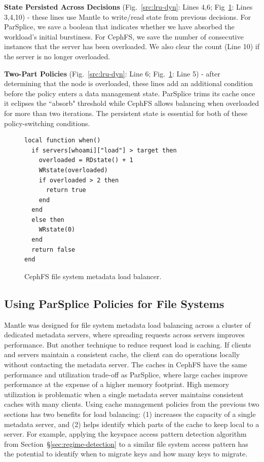 \textbf{State Persisted Across Decisions} (Fig.~\ref{src:lru-dyn}: Lines 4,6;
Fig~\ref{src:lua-cephfs}: Lines 3,4,10) - these lines use Mantle to write/read state
from previous decisions.  For ParSplice, we save a boolean that indicates
whether we have absorbed the workload's initial burstiness. For CephFS, we save
the number of consecutive instances that the server has been overloaded. We
also clear the count (Line 10) if the server is no longer overloaded. 

\textbf{Two-Part Policies} (Fig.~\ref{src:lru-dyn}: Line 6;
Fig.~\ref{src:lua-cephfs}: Line 5) - after determining that the node is
overloaded, these lines add an additional condition before the policy enters a
data management state.  ParSplice trims its cache once it eclipses the
``absorb" threshold while CephFS allows balancing when overloaded for more than
two iterations. The persistent state is essential for both of these
policy-switching conditions.

\begin{figure}[t]
\footnotesize
\begin{verbatim}
local function when()
  if servers[whoami]["load"] > target then
    overloaded = RDstate() + 1
    WRstate(overloaded)
    if overloaded > 2 then
      return true
    end
  end
  else then
    WRstate(0)
  end
  return false
end
\end{verbatim}
\caption{CephFS file system metadata load balancer.\label{src:lua-cephfs}}
\end{figure}

\subsection{Using ParSplice Policies for File Systems}


Mantle was designed for file system metadata load balancing across a cluster of
dedicated metadata servers, where spreading requests across servers improves
performance. But another technique to reduce request load is caching. If
clients and servers maintain a consistent cache, the client can do operations
locally without contacting the metadata server.  The caches in CephFS have the
same performance and utilization trade-off as ParSplice, where large caches
improve performance at the expense of a higher memory footprint. High memory
utilization is problematic when a single metadata server maintains consistent
caches with many clients.  Using cache management policies from the previous
two sections has two benefits for load balancing: (1) increases the capacity of
a single metadata server, and (2) helps identify which parts of the cache to
keep local to a server. For example, applying the keyspace access pattern
detection algorithm from Section~\S\ref{sec:regime-detection} to a similar file
system access pattern has the potential to identify when to migrate keys and
how many keys to migrate.

